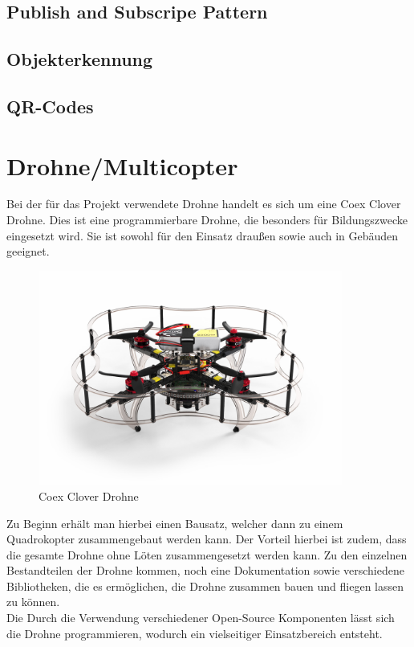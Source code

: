     \subsection{Publish and Subscripe Pattern}

    \subsection{Objekterkennung}

    \subsection{QR-Codes}

\section{Drohne/Multicopter}
Bei der für das Projekt verwendete Drohne handelt es sich um eine Coex Clover Drohne. Dies ist eine programmierbare Drohne, die besonders für Bildungszwecke eingesetzt wird. Sie ist sowohl für den Einsatz draußen sowie auch in Gebäuden geeignet. \\

\begin{figure}[htpb]
    \centering
    \includegraphics[width=10cm,keepaspectratio,angle=0]{images/coex_clover.jpg}
    \caption[Coex Clover Drohne]{\label{img coex_clover} Coex Clover Drohne \cite{img_coex_clover}}
\end{figure}

Zu Beginn erhält man hierbei einen Bausatz, welcher dann zu einem Quadrokopter zusammengebaut werden kann. Der Vorteil hierbei ist zudem, dass die gesamte Drohne ohne Löten zusammengesetzt werden kann. Zu den einzelnen Bestandteilen der Drohne kommen, noch eine Dokumentation sowie verschiedene Bibliotheken, die es ermöglichen, die Drohne zusammen bauen und fliegen lassen zu können. \\
Die 
Durch die Verwendung verschiedener Open-Source Komponenten lässt sich die Drohne programmieren, wodurch ein vielseitiger Einsatzbereich entsteht.\\

